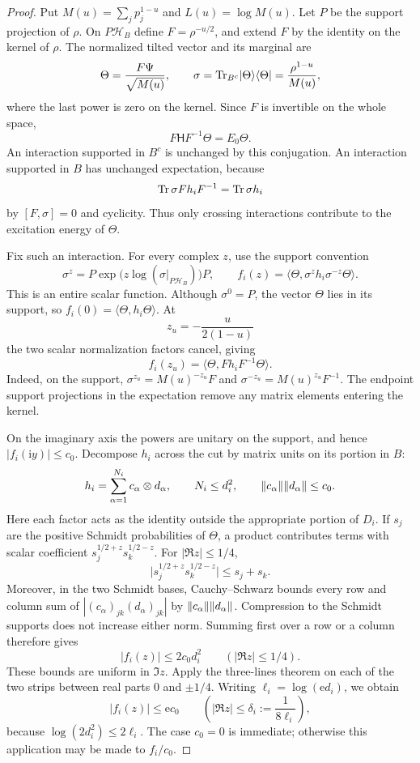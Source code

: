 \begin{proof}
Put $M(u)=\sum_jp_j^{1-u}$ and $L(u)=\log M(u)$.  Let $P$ be the
support projection of $\rho$.  On $P\mathcal H_B$ define
$F=\rho^{-u/2}$, and extend $F$ by the identity on the kernel of $\rho$.
The normalized tilted vector and its marginal are
\[
 \Theta=\frac{F\Psi}{\sqrt{M(u)}},\qquad
 \sigma=\operatorname{Tr}_{B^c}\lvert \Theta\rangle\langle \Theta\rvert
       =\frac{\rho^{1-u}}{M(u)},
\]
where the last power is zero on the kernel.  Since $F$ is invertible on
the whole space,
\begin{equation}
 F\mathsf H F^{-1}\Theta=E_0\Theta.
 \label{eq:initial-exact-tilt}
\end{equation}
An interaction supported in $B^c$ is unchanged by this conjugation.  An
interaction supported in $B$ has unchanged expectation, because
\[
 \operatorname{Tr}\sigma Fh_iF^{-1}=\operatorname{Tr}\sigma h_i
\]
by $[F,\sigma]=0$ and cyclicity.  Thus only crossing interactions
contribute to the excitation energy of $\Theta$.

Fix such an interaction.  For every complex $z$, use the support
convention
\[
 \sigma^z=P\exp\bigl(z\log(\sigma|_{P\mathcal H_B})\bigr)P,
 \qquad
 f_i(z)=\langle\Theta,\sigma^z h_i\sigma^{-z}\Theta\rangle.
\]
This is an entire scalar function.  Although $\sigma^0=P$, the vector
$\Theta$ lies in its support, so $f_i(0)=\langle\Theta,h_i\Theta\rangle$.
At
\[
 z_u=-\frac{u}{2(1-u)}
\]
the two scalar normalization factors cancel, giving
\begin{equation}
 f_i(z_u)=\langle\Theta,Fh_iF^{-1}\Theta\rangle.
 \label{eq:initial-support-conjugation}
\end{equation}
Indeed, on the support,
$\sigma^{z_u}=M(u)^{-z_u}F$ and
$\sigma^{-z_u}=M(u)^{z_u}F^{-1}$.  The endpoint support projections
in the expectation remove any matrix elements entering the kernel.

On the imaginary axis the powers are unitary on the support, and hence
$|f_i(\mathrm i y)|\le c_0$.  Decompose $h_i$ across the cut by matrix
units on its portion in $B$:
\[
 h_i=\sum_{\alpha=1}^{N_i}c_\alpha\otimes d_\alpha,
 \qquad N_i\le d_i^2,
 \qquad \lVert c_\alpha\rVert\lVert d_\alpha\rVert\le c_0.
\]
Here each factor acts as the identity outside the appropriate portion
of $D_i$.  If $s_j$ are the positive Schmidt probabilities of $\Theta$,
a product contributes terms with scalar coefficient
$s_j^{1/2+z}s_k^{1/2-z}$.  For $|\Re z|\le1/4$,
\[
 \bigl|s_j^{1/2+z}s_k^{1/2-z}\bigr|\le s_j+s_k.
\]
Moreover, in the two Schmidt bases, Cauchy--Schwarz bounds every row
and column sum of $|(c_\alpha)_{jk}(d_\alpha)_{jk}|$ by
$\lVert c_\alpha\rVert\lVert d_\alpha\rVert$.  Compression to the Schmidt supports
does not increase either norm.  Summing first over a row or a column
therefore gives
\[
 |f_i(z)|\le2c_0d_i^2\qquad(|\Re z|\le1/4).
\]
These bounds are uniform in $\Im z$.  Apply the three-lines theorem
on each of the two strips between real parts $0$ and $\pm1/4$.
Writing $\ell_i=\log(\mathrm e d_i)$, we obtain
\begin{equation}
 |f_i(z)|\le\mathrm e c_0
 \qquad\left(|\Re z|\le\delta_i:=\frac1{8\ell_i}\right),
 \label{eq:initial-narrow-strip}
\end{equation}
because $\log(2d_i^2)\le2\ell_i$.  The case $c_0=0$ is immediate;
otherwise this application may be made to $f_i/c_0$.


\end{proof}
